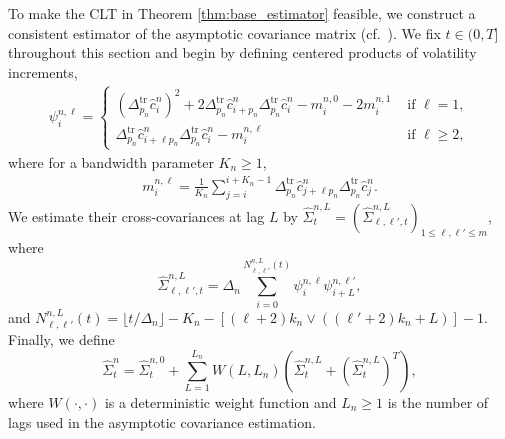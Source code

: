 \documentclass[ecta,nameyear,draft]{econsocart}
\def\wh{\widehat}
\newcommand{\1}{\mathbf 1}
\newcommand{\tr}{\mathrm{tr}}
\numberwithin{equation}{section}
\newcommand{\Den}{\Delta_n}
\begin{document}
To make the CLT  in Theorem \ref{thm:base_estimator} feasible, we construct a consistent estimator  of the asymptotic covariance matrix (cf.\   \cite{li2016generalized}). We fix $t\in(0,T]$ throughout this section and begin by defining  centered products of volatility increments,
\begin{align*}
	\psi^{n,\ell}_i = 
	\begin{cases}
		(\Delta^\tr_{p_n} \wh c^{n}_i)^2+ 2 \Delta^\tr_{p_n} \wh c^{n}_{i+ p_n} 	\Delta^\tr_{p_n} \wh c^{n}_i - m^{n,0}_i - 2 m^{n,1}_i & \text{ if } \ell = 1,
		\\
		 \Delta^\tr_{p_n} \wh c^{n}_{i+\ell p_n} 	\Delta^\tr_{p_n} \wh c^{n}_i- m_{i}^{n,\ell} & \text{ if } \ell \geq 2,
	\end{cases}    
\end{align*}
where for a bandwidth parameter $K_n \geq 1$,
\begin{align*}
    m_{i}^{n,\ell}
    =
    \frac{1}{K_n}
    \sum_{j=i}^{i+K_n-1}
   \Delta^\tr_{p_n} \wh c^{n}_{j+\ell p_n} 	\Delta^\tr_{p_n} \wh c^{n}_j.
\end{align*}
We estimate their  cross-covariances at lag $L$ by $\wh\Sigma^{n,L}_t =  (\wh \Sigma^{n,L}_{\ell,\ell',t}  )_{1\leq \ell,\ell'\leq m}$, where
\begin{equation}
\label{eq:def:Sigma}
\wh\Sigma^{n,L}_{\ell,\ell',t}  
    =
\Den
	\sum
	_{i=0}^{N^{n,L}_{\ell,\ell'}(t)}
	\psi^{n,\ell}_i
	\psi^{n,\ell'}_{i+L},
\end{equation}
and  $N^{n,L}_{\ell,\ell'}(t)=\lfloor t/\Delta_n \rfloor-K_n- [(\ell + 2) k_n \vee( (\ell' + 2) k_n + L)] - 1$. %
Finally, we define
\begin{equation}
\wh \Sigma^{n}_t =  
\wh  \Sigma^{n,0}_t +  \sum_{L=1}^{L_n} W(L,L_n) (\wh  \Sigma^{n,L}_t + (\wh\Sigma^{n,L}_t)^{T}),
\end{equation}
where $W(\cdot,\cdot)$ is a deterministic weight function and $L_n \geq 1$ is the number of lags used in the asymptotic covariance estimation. 
\end{document}
